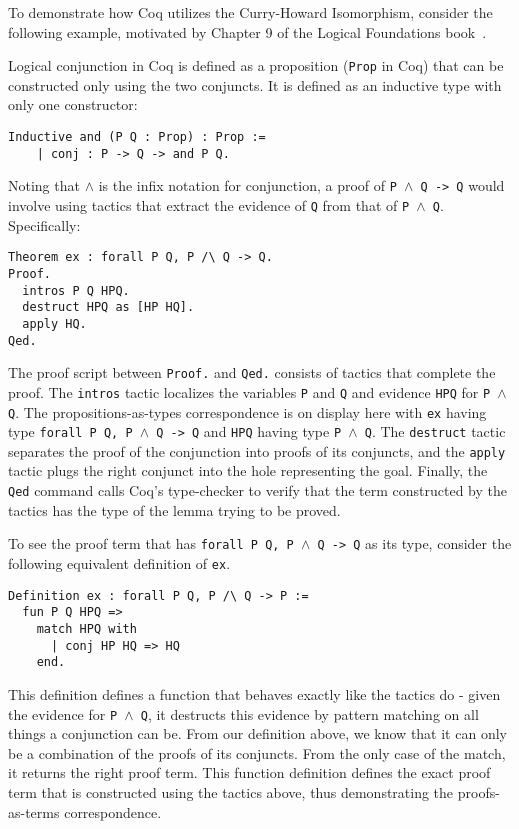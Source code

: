 \documentclass{article}
\begin{document}
	To demonstrate how Coq utilizes 
	the Curry-Howard Isomorphism, 
	consider the following example, 
	motivated by Chapter 9 of the 
	Logical Foundations 
	book~\cite{Pierce:SF1}.
	
	Logical conjunction in Coq is 
	defined as a proposition 
	(\texttt{Prop} in Coq) that 
	can be constructed only using 
	the two conjuncts. It is defined
	as an inductive type with 
	only one constructor:
	\begin{verbatim}
Inductive and (P Q : Prop) : Prop :=
	| conj : P -> Q -> and P Q.
	\end{verbatim}
	
	Noting that $\land$ is the infix 
	notation for conjunction, 
	a proof of \texttt{P $\land$ Q -> Q} 
	would involve using tactics that
	extract the evidence of \texttt{Q}
	from that of \texttt{P $\land$ Q}.
	Specifically:
	\begin{verbatim}
Theorem ex : forall P Q, P /\ Q -> Q.
Proof.
  intros P Q HPQ. 
  destruct HPQ as [HP HQ].
  apply HQ.
Qed.
	\end{verbatim}
	The proof script between 
	\texttt{Proof.} and \texttt{Qed.}
	consists of tactics that complete 
	the proof. The \texttt{intros}
	tactic localizes the variables 
	\texttt{P} and \texttt{Q} and 
	evidence \texttt{HPQ} for 
	\texttt{P $\land$ Q}. The 
	propositions-as-types correspondence
	is on display here with \texttt{ex}
	having type 
	\texttt{forall P Q, P $\land$ Q -> Q}
	and \texttt{HPQ} having type
	\texttt{P $\land$ Q}. The 
	\texttt{destruct} tactic separates 
	the proof of the conjunction into 
	proofs of its conjuncts, and the 
	\texttt{apply} tactic plugs the 
	right conjunct into the hole 
	representing the goal. Finally,
	the \texttt{Qed} command calls 
	Coq's type-checker to verify that 
	the term constructed by the 
	tactics has the type of the 
	lemma trying to be proved.
	
	To see the proof term that has 
	\texttt{forall P Q, P $\land$ Q -> Q}
	as its type, consider the following
	equivalent definition of \texttt{ex}.
	
\begin{verbatim}
Definition ex : forall P Q, P /\ Q -> P :=
  fun P Q HPQ => 
    match HPQ with
	  | conj HP HQ => HQ
    end.
\end{verbatim}
	This definition defines a function that 
	behaves exactly like the tactics do - 
	given the evidence for \texttt{P $\land$ Q},
	it destructs this evidence by pattern
	matching on all things a conjunction can 
	be. From our definition above, we know 
	that it can only be a combination of 
	the proofs of its conjuncts. From the 
	only case of the match, it returns the 
	right proof term. This function 
	definition defines the exact proof term 
	that is constructed using the tactics 
	above, thus demonstrating the 
	proofs-as-terms correspondence.
\end{document}
